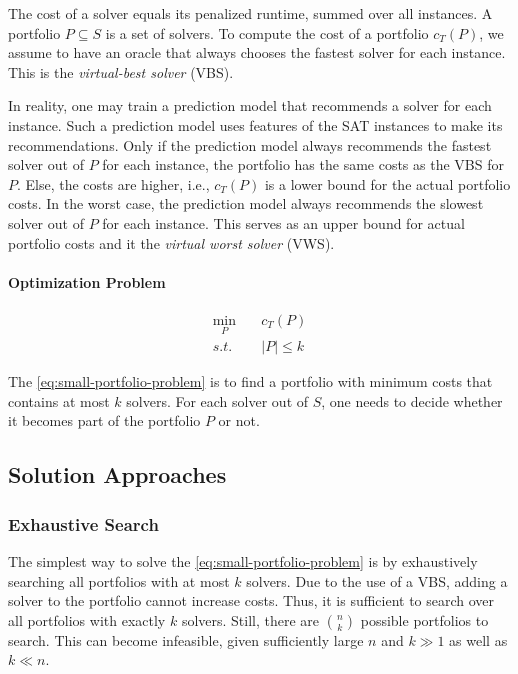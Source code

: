 The cost of a solver equals its penalized runtime, summed over all instances.
A portfolio $P \subseteq S$ is a set of solvers.
To compute the cost of a portfolio $c_{T}(P)$, we assume to have an oracle that always chooses the fastest solver for each instance.
This is the \emph{virtual-best solver} (VBS).

In reality, one may train a prediction model that recommends a solver for each instance.
Such a prediction model uses features of the SAT instances to make its recommendations.
Only if the prediction model always recommends the fastest solver out of $P$ for each instance, the portfolio has the same costs as the VBS for $P$.
Else, the costs are higher, i.e., $c_{T}(P)$ is a lower bound for the actual portfolio costs.
In the worst case, the prediction model always recommends the slowest solver out of $P$ for each instance.
This serves as an upper bound for actual portfolio costs and it the \emph{virtual worst solver} (VWS).

\paragraph{Optimization Problem}

\begin{equation}
	\label{eq:small-portfolio-problem}
	\begin{aligned}
		\min_P \quad & c_{T}(P)\\
		s.t. \quad & |P| \leq k
	\end{aligned}
   \tag{Small-Portfolio Problem}
\end{equation}

The \ref{eq:small-portfolio-problem} is to find a portfolio with minimum costs that contains at most $k$ solvers.
For each solver out of $S$, one needs to decide whether it becomes part of the portfolio $P$ or not.

\subsection{Solution Approaches}

\subsubsection{Exhaustive Search}

The simplest way to solve the \ref{eq:small-portfolio-problem} is by exhaustively searching all portfolios with at most $k$ solvers.
Due to the use of a VBS, adding a solver to the portfolio cannot increase costs.
Thus, it is sufficient to search over all portfolios with exactly $k$ solvers.
Still, there are $\binom{n}{k}$ possible portfolios to search.
This can become infeasible, given sufficiently large $n$ and $k \gg 1$ as well as $k \ll n$.


